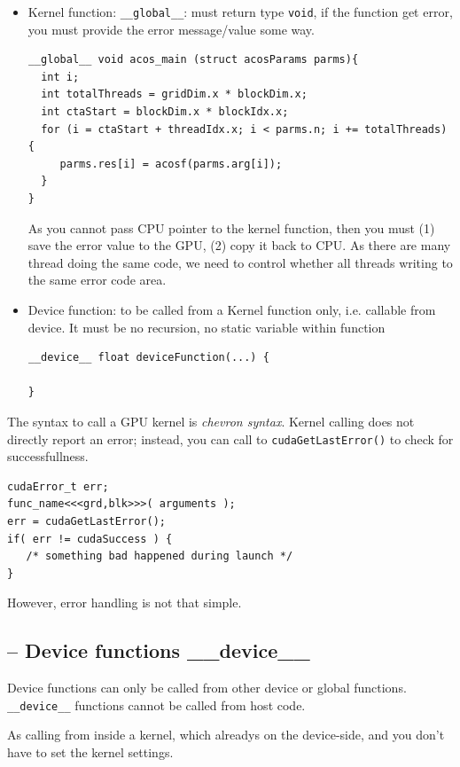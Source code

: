 \begin{itemize}
\item Kernel function: \verb!__global__!: must return type
  \verb!void!, if the function get error, you must provide the error
  message/value some way.
\begin{lstlisting}
__global__ void acos_main (struct acosParams parms){
  int i;
  int totalThreads = gridDim.x * blockDim.x;
  int ctaStart = blockDim.x * blockIdx.x;
  for (i = ctaStart + threadIdx.x; i < parms.n; i += totalThreads) {
     parms.res[i] = acosf(parms.arg[i]);
  }
}
\end{lstlisting}
As you cannot pass CPU pointer to the kernel function, then you must
(1) save the error value to the GPU, (2) copy it back to CPU. As there
are many thread doing the same code, we need to control whether all
threads writing to the same error code area.

\item Device function: to be called from a Kernel function only,
  i.e. callable from device. It must be no recursion, no static
  variable within function
\begin{lstlisting}
__device__ float deviceFunction(...) {

}
\end{lstlisting}

\end{itemize}

The syntax to call a GPU kernel is {\it chevron syntax}. Kernel
calling does not directly report an error; instead, you can call to
\verb!cudaGetLastError()! to check for successfullness. 
\begin{lstlisting}
cudaError_t err;
func_name<<<grd,blk>>>( arguments );
err = cudaGetLastError();
if( err != cudaSuccess ) {
   /* something bad happened during launch */
}
\end{lstlisting}

However, error handling is not that simple. 

\subsection{-- Device functions \_\_device\_\_}
\label{sec:__device__functions}

Device functions can only be called from other device or global functions.
\verb!__device__! functions cannot be called from host code.

As calling from inside a kernel, which alreadys on the device-side, and you
don't have to set the kernel settings.

